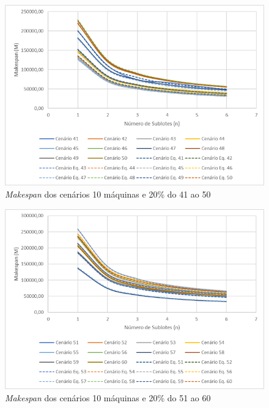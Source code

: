 \begin{figure}[H]
    \centering
     \includegraphics[width=13cm]{Apendices/Figuras/10m20_41-50.png}
     \caption{\textit{Makespan} dos cenários 10 máquinas e 20\% do 41 ao 50}
    \label{fig:10m20_41-50}
\end{figure}

\begin{figure}[H]
    \centering
     \includegraphics[width=13cm]{Apendices/Figuras/10m20_51-60.png}
     \caption{\textit{Makespan} dos cenários 10 máquinas e 20\% do 51 ao 60}
    \label{fig:10m20_51-60}
\end{figure}


